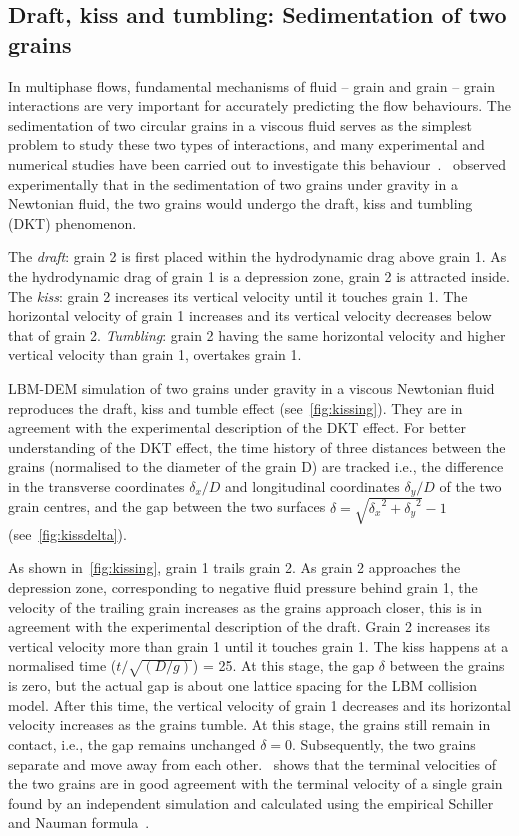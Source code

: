 \subsection{Draft, kiss and tumbling: Sedimentation of two grains}

In multiphase flows, fundamental mechanisms of fluid -- grain and grain – grain 
interactions are very important for accurately predicting the flow behaviours. 
The sedimentation of two circular grains in a viscous fluid serves as the 
simplest problem to study these two types of interactions, and many 
experimental and numerical studies have been carried out to investigate this 
behaviour~\citep{Wang2014,Komiwes2005}.~\citet{Fortes1987} observed 
experimentally that in the sedimentation of two grains under gravity in a 
Newtonian fluid, the two grains would undergo the draft, kiss and tumbling 
(DKT) phenomenon.

The \emph{draft}: grain 2 is first placed within the hydrodynamic drag above 
grain 1. As the hydrodynamic drag of grain 1 is a depression zone, 
grain 2 is attracted inside. The \emph{kiss}: grain 2 increases its 
vertical velocity until it touches grain 1. The horizontal velocity of 
grain 1 increases and its vertical velocity decreases below that of 
grain 2. \emph{Tumbling}: grain 2 having the same horizontal velocity and 
higher vertical velocity than grain 1, overtakes grain 1.
%

LBM-DEM simulation of two grains under gravity in a viscous Newtonian fluid 
reproduces the draft, kiss and tumble effect (see~\cref{fig:kissing}). They 
are in agreement with the experimental description of the DKT effect. For 
better understanding of the DKT effect, the time history of three distances 
between the grains (normalised to the diameter of the grain D) are tracked 
i.e., the difference in the transverse coordinates $\delta_x/D$ and 
longitudinal coordinates $\delta_y/D$ of the two grain centres, and the gap 
between the two surfaces $\delta = \sqrt{{\delta_x}^2+{\delta_y}^2} - 1 $ 
(see~\cref{fig:kissdelta}). 

As shown in~\cref{fig:kissing}, grain 1 trails grain 2. As grain 2 approaches 
the depression zone, corresponding to negative fluid pressure behind grain 1, 
the velocity of the trailing grain increases as the grains approach closer, 
this is in agreement with the experimental description of the draft. Grain 2 
increases its vertical velocity more than grain 1 until it touches grain 1. The 
kiss happens at a normalised time ($t/\sqrt{(D/g)}$)  = 25. At this stage, the 
gap $\delta$ between the grains is zero, but the actual gap is about one 
lattice spacing for the LBM collision model. After this time, the vertical 
velocity of grain 1 decreases and its horizontal velocity increases as the 
grains tumble. At this stage, the grains still remain in contact, i.e., the gap 
remains unchanged $\delta=0$. Subsequently, the two grains separate and move 
away from each other.~ shows that the terminal 
velocities of the two grains are in good agreement with the terminal velocity 
of a single grain found by an independent simulation and calculated using the 
empirical Schiller and Nauman formula~\citep{Komiwes2005}.

